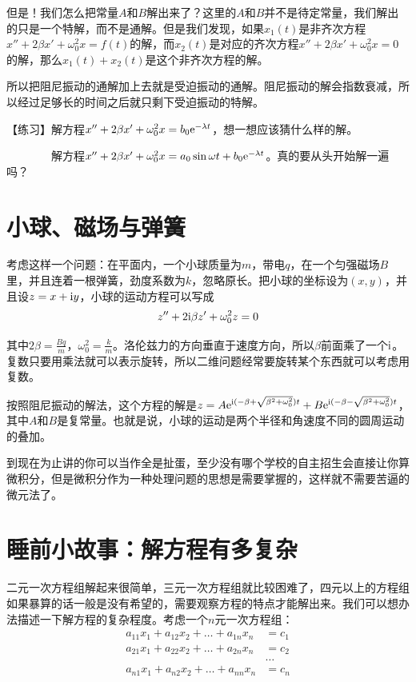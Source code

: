 但是！我们怎么把常量$A$和$B$解出来了？这里的$A$和$B$并不是待定常量，我们解出的只是一个特解，而不是通解。但是我们发现，如果$x_1(t)$是非齐次方程$x''+2 \beta x'+\omega_0^2 x=f(t)$的解，而$x_2(t)$是对应的齐次方程$x''+2 \beta x'+\omega_0^2 x=0$的解，那么$x_1(t)+x_2(t)$是这个非齐次方程的解。

所以把阻尼振动的通解加上去就是受迫振动的通解。阻尼振动的解会指数衰减，所以经过足够长的时间之后就只剩下受迫振动的特解。

【练习】解方程$x''+2 \beta x'+\omega_0^2 x=b_0 \mathrm{e}^{-\lambda t}$，想一想应该猜什么样的解。

$\phantom{\text{【练习】}}$解方程$x''+2 \beta x'+\omega_0^2 x=a_0 \sin \omega t+b_0 \mathrm{e}^{-\lambda t}$。真的要从头开始解一遍吗？
\section{小球、磁场与弹簧}
考虑这样一个问题：在平面内，一个小球质量为$m$，带电$q$，在一个匀强磁场$B$里，并且连着一根弹簧，劲度系数为$k$，忽略原长。把小球的坐标设为$(x,y)$，并且设$z=x+\mathrm{i} y$，小球的运动方程可以写成
\begin{equation*}
z''+2 \mathrm{i} \beta z'+\omega_0^2 z=0
\end{equation*}

其中$2 \beta=\frac{B q}{m}$，$\omega_0^2=\frac{k}{m}$。洛伦兹力的方向垂直于速度方向，所以$\beta$前面乘了一个$\mathrm{i}$。复数只要用乘法就可以表示旋转，所以二维问题经常要旋转某个东西就可以考虑用复数。

按照阻尼振动的解法，这个方程的解是$z=A \mathrm{e}^{\mathrm{i} (-\beta+\sqrt{\beta^2+\omega_0^2}) t}+B \mathrm{e}^{\mathrm{i} (-\beta-\sqrt{\beta^2+\omega_0^2}) t}$，其中$A$和$B$是复常量。也就是说，小球的运动是两个半径和角速度不同的圆周运动的叠加。

到现在为止讲的你可以当作全是扯蛋，至少没有哪个学校的自主招生会直接让你算微积分，但是微积分作为一种处理问题的思想是需要掌握的，这样就不需要苦逼的微元法了。
\section{睡前小故事：解方程有多复杂}
二元一次方程组解起来很简单，三元一次方程组就比较困难了，四元以上的方程组如果暴算的话一般是没有希望的，需要观察方程的特点才能解出来。我们可以想办法描述一下解方程的复杂程度。考虑一个$n$元一次方程组：
\begin{align*}
a_{1 1} x_1+a_{1 2} x_2+\dots+a_{1 n} x_n&=c_1 \\
a_{2 1} x_1+a_{2 2} x_2+\dots+a_{2 n} x_n&=c_2 \\
&\dots \\
a_{n 1} x_1+a_{n 2} x_2+\dots+a_{n n} x_n&=c_n
\end{align*}

